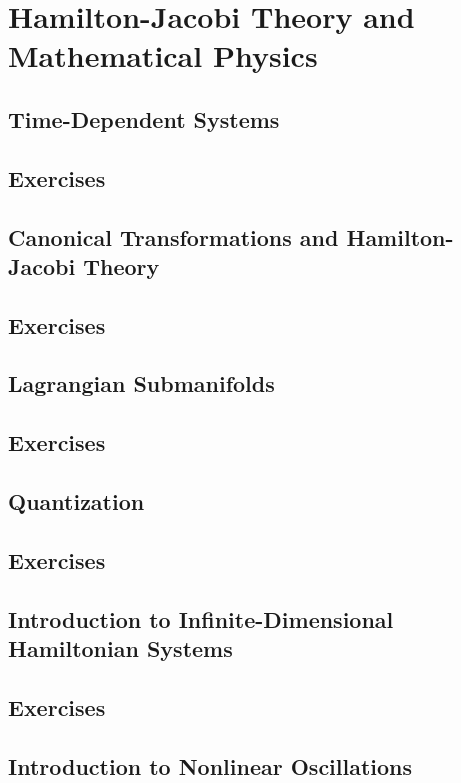 \chapter{Hamilton-Jacobi Theory and Mathematical Physics}
\section{Time-Dependent Systems}
\section*{Exercises}
\section{Canonical Transformations and Hamilton-Jacobi Theory}
\section*{Exercises}
\section{Lagrangian Submanifolds}
\section*{Exercises}
\section{Quantization}
\section*{Exercises}
\section{Introduction to Infinite-Dimensional Hamiltonian Systems}
\section*{Exercises}
\section{Introduction to Nonlinear Oscillations}
